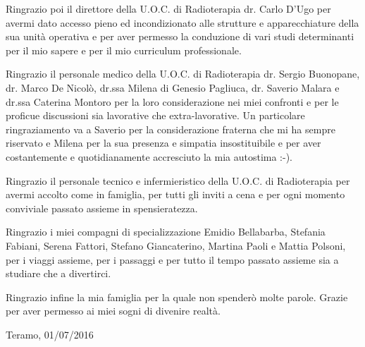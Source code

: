 \vspace*{2ex}

Ringrazio poi il direttore della U.O.C. di Radioterapia dr. Carlo D'Ugo per avermi dato accesso pieno ed incondizionato alle strutture e apparecchiature della sua unità operativa e per aver permesso la conduzione di vari studi determinanti per il mio sapere e per il mio curriculum professionale.

\vspace*{2ex}

Ringrazio il personale medico della U.O.C. di Radioterapia dr. Sergio Buonopane, dr. Marco De Nicolò, dr.ssa Milena di Genesio Pagliuca, dr. Saverio Malara e dr.ssa Caterina Montoro per la loro considerazione nei miei confronti e per le proficue discussioni sia lavorative che extra-lavorative. Un particolare ringraziamento va a Saverio per la considerazione fraterna che mi ha sempre riservato e Milena per la sua presenza e simpatia insostituibile e per aver costantemente e quotidianamente accresciuto la mia autostima :-).

\vspace*{2ex}

Ringrazio il personale tecnico e infermieristico della U.O.C. di Radioterapia per avermi accolto come in famiglia, per tutti gli inviti a cena e per ogni momento conviviale passato assieme in spensieratezza.

\vspace*{2ex}

Ringrazio i miei compagni di specializzazione Emidio Bellabarba, Stefania Fabiani, Serena Fattori, Stefano Giancaterino, Martina Paoli e Mattia Polsoni, per i viaggi assieme, per i passaggi e per tutto il tempo passato assieme sia a studiare che a divertirci.

\vspace*{2ex}

Ringrazio infine la mia famiglia per la quale non spenderò molte parole. Grazie per aver permesso ai miei sogni di divenire realtà.

\vspace*{2ex}
\begin{flushright}
Teramo, 01/07/2016
\end{flushright}







 